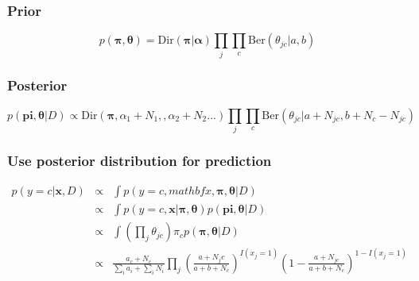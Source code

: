 \documentclass[11pt]{article}
\begin{document}
\subsubsection{Prior}
\[
p(\mathbf{\pi,\theta}) = \mathrm{Dir}(\mathbf{\pi}|\mathbf{\alpha})\prod_j \prod_c \mathrm{Ber}(\theta_{jc}|a,b)
\]
\subsubsection{Posterior}
\[
p(\mathbf{pi,\theta}|D) \propto \mathrm{Dir}(\mathbf{\pi},\alpha_1+N_1,,\alpha_2+N_2...) \prod_j \prod_c \mathrm{Ber}(\theta_{jc}|a+N_{jc},b+N_c-N_{jc})
\]
\subsubsection{Use posterior distribution for prediction}
\begin{eqnarray*}
p(y=c|\mathbf{x},D) &\propto& \int p(y=c,mathbf{x},\mathbf{\pi,\theta}|D) \\
&\propto& \int p(y=c,\mathbf{x}|\mathbf{\pi,\theta})p(\mathbf{pi,\theta}|D)\\
&\propto& \int (\prod_j \theta_{jc})\pi_c p(\mathbf{\pi,\theta}|D)\\
&\propto& \frac{a_c+N_c}{\sum_i a_i + \sum_i N_i} \prod_j\left(\frac{a+N_jc}{a+b+N_c}\right)^{I(x_j=1)}\left(1-\frac{a+N_{jc}}{a+b+N_c}\right)^{1-I(x_j=1)}
\end{eqnarray*}
\end{document}
